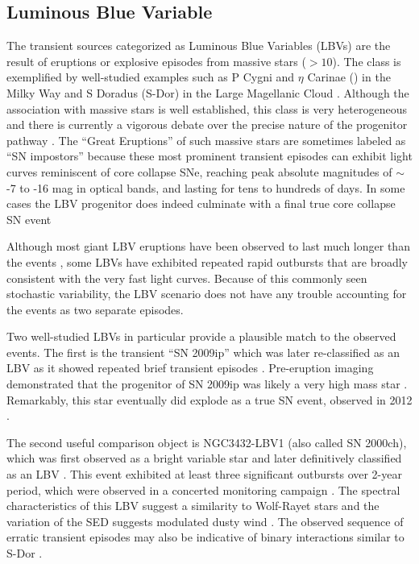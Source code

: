 \subsection{Luminous Blue Variable}

The transient sources categorized as Luminous Blue Variables (LBVs)
are the result of eruptions or explosive episodes from massive stars
($>10$\Msun).  The class is exemplified by well-studied examples such
as P Cygni and $\eta$ Carinae (\etacar) in the Milky Way and S Doradus
(S-Dor) in the Large Magellanic Cloud \citep[for recent overviews of
  the LBV class, see][]{Smith:2011b, Kochanek:2012}.  Although the
association with massive stars is well established, this class is very
heterogeneous and there is currently a vigorous debate over the
precise nature of the progenitor pathway
\citep{Smith:2015,Humphreys:2016,Smith:2016}.  The ``Great Eruptions''
of such massive stars are sometimes labeled as ``SN impostors''
because these most prominent transient episodes can exhibit light
curves reminiscent of core collapse SNe, reaching peak absolute
magnitudes of $\sim$-7 to -16 mag in optical bands, and lasting for
tens to hundreds of days.  In some cases the LBV progenitor does
indeed culminate with a final true core collapse SN event
\citep[e.g.][]{Mauerhan:2013, Tartaglia:2016}

Although most giant LBV eruptions have been observed to last much
longer than the \spock events \citep{Smith:2011b}, some LBVs have
exhibited repeated rapid outbursts that are broadly consistent with
the very fast \spock light curves. Because of this commonly seen
stochastic variability, the LBV scenario does not have any trouble
accounting for the \spock events as two separate episodes.

Two well-studied LBVs in particular provide a plausible match to the
observed \spock events.  The first is the transient ``SN 2009ip''
\citep{Maza:2009} which was later re-classified as an LBV as it showed
repeated brief transient episodes \citep[e.g.,][]{Miller:2009,
  Li:2009, Berger:2009, Drake:2010}. Pre-eruption \HST imaging
demonstrated that the progenitor of SN 2009ip was likely a very high
mass star \citep[$\gtrsim50$ \Msun,][]{Smith:2010, Foley:2011}.
Remarkably, this star eventually did explode as a true SN event,
observed in 2012 \citep{Mauerhan:2013, Pastorello:2013, Prieto:2013}.

The second useful comparison object is NGC3432-LBV1 (also called SN
2000ch), which was first observed as a bright variable star
\citep{Papenkova:2000} and later definitively classified as an LBV
\citep{Wagner:2004}.  This event exhibited at least three significant
outbursts over 2-year period, which were observed in a concerted
monitoring campaign \citep{Pastorello:2010}.  The spectral
characteristics of this LBV suggest a similarity to Wolf-Rayet stars
\citep{Pastorello:2010} and the variation of the SED suggests
modulated dusty wind \citep{Wagner:2004, Kochanek:2012}. The observed
sequence of erratic transient episodes may also be indicative of
binary interactions similar to S-Dor \citep{Pastorello:2010,
  Smith:2011b}.


